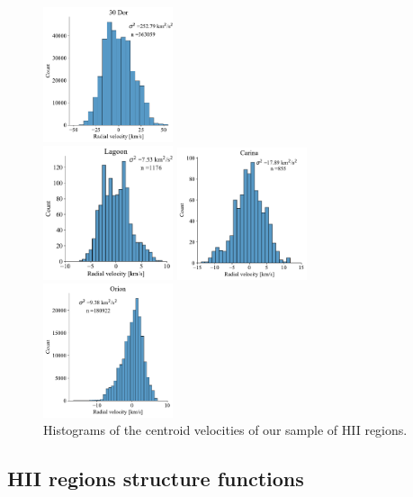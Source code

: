 \documentclass[fleqn,usenatbib, useAMS, a4paper]{mnras}
\begin{document}
\begin{figure}
\begin{multicols}{3}
\includegraphics[width=1.5in]{Figures/Hist/30Dor}\par
\end{multicols}
\begin{multicols}{3}
\includegraphics[width=1.5in]{Figures/Hist/M8}\par
\includegraphics[width=1.5in]{Figures/Hist/Car}\par
\includegraphics[width=1.5in]{Figures/Hist/OrionS}\par
\end{multicols}
\caption{Histograms of the centroid velocities of our sample of HII regions. }
\label{fig:hist}
\end{figure}

\subsection{HII regions structure functions}
\end{document}
